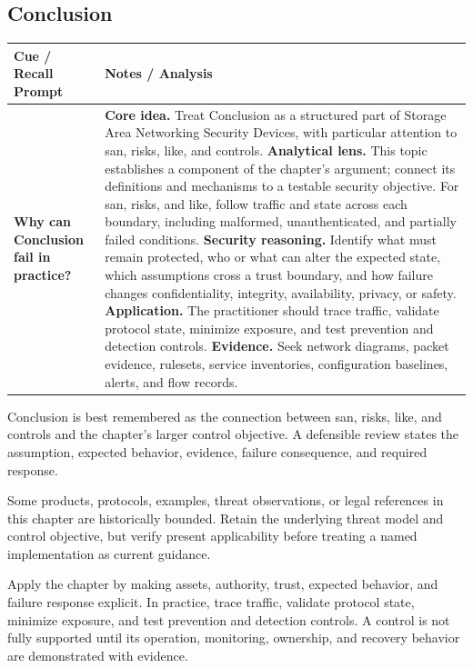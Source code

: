 \documentclass[11pt]{article}
\newcommand{\CornellHeader}{%
\rowcolor{Navy}\color{white}\bfseries Cue / Recall Prompt & \color{white}\bfseries Notes / Analysis\\\hline}
\newcommand{\CornellRow}[2]{%
\cellcolor{CueGray}\RaggedRight\textbf{#1} & \RaggedRight #2\\\hline}
\begin{document}
\subsection*{Conclusion}
\begin{longtable}{>{\RaggedRight\arraybackslash}p{}|>{\RaggedRight\arraybackslash}p{}}
\CornellHeader
\CornellRow{Why can Conclusion fail in practice?}{\textbf{Core idea.} Treat Conclusion as a structured part of Storage Area Networking Security Devices, with particular attention to san, risks, like, and controls. \textbf{Analytical lens.} This topic establishes a component of the chapter's argument; connect its definitions and mechanisms to a testable security objective. For san, risks, and like, follow traffic and state across each boundary, including malformed, unauthenticated, and partially failed conditions. \textbf{Security reasoning.} Identify what must remain protected, who or what can alter the expected state, which assumptions cross a trust boundary, and how failure changes confidentiality, integrity, availability, privacy, or safety. \textbf{Application.} The practitioner should trace traffic, validate protocol state, minimize exposure, and test prevention and detection controls. \textbf{Evidence.} Seek network diagrams, packet evidence, rulesets, service inventories, configuration baselines, alerts, and flow records.}
\end{longtable}
\begin{topicsummary}
Conclusion is best remembered as the connection between san, risks, like, and controls and the chapter's larger control objective. A defensible review states the assumption, expected behavior, evidence, failure consequence, and required response.
\end{topicsummary}
\begin{historybox}
Some products, protocols, examples, threat observations, or legal references in this chapter are historically bounded. Retain the underlying threat model and control objective, but verify present applicability before treating a named implementation as current guidance.
\end{historybox}
\begin{defensebox}
Apply the chapter by making assets, authority, trust, expected behavior, and failure response explicit. In practice, trace traffic, validate protocol state, minimize exposure, and test prevention and detection controls. A control is not fully supported until its operation, monitoring, ownership, and recovery behavior are demonstrated with evidence.
\end{defensebox}
\end{document}
